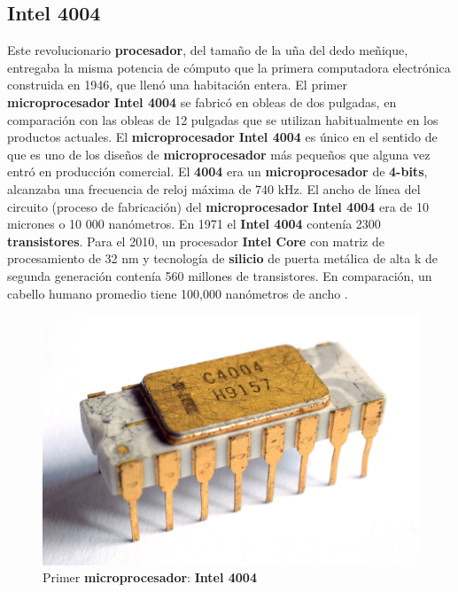 \subsection{\textbf{Intel 4004}}
Este revolucionario \textbf{procesador}, del tamaño de la uña del dedo meñique, entregaba la misma potencia de cómputo que la primera
computadora electrónica construida en 1946, que llenó una habitación entera. El primer \textbf{microprocesador} \textbf{Intel 4004} se
fabricó en obleas de dos pulgadas, en comparación con las obleas de 12 pulgadas que se utilizan habitualmente en los productos actuales.
El \textbf {microprocesador} \textbf{Intel 4004} es único en el sentido de que es uno de los diseños de \textbf{microprocesador} más
pequeños que alguna vez entró en producción comercial. El \textbf{4004}  era un \textbf{microprocesador} de \textbf{4-bits}, alcanzaba una 
frecuencia de reloj máxima de 740 kHz. El ancho de línea del circuito (proceso de fabricación) del \textbf{microprocesador} \textbf{Intel 4004} 
era de 10 micrones o 10 000 nanómetros. En 1971 el \textbf{Intel 4004} contenía 2300 \textbf{transistores}. Para el 2010, un procesador \textbf{Intel Core} con matriz de procesamiento
de 32 nm y tecnología de \textbf{silicio} de puerta metálica de alta k de segunda generación contenía  560 millones de transistores. En comparación,
un cabello humano promedio tiene 100,000 nanómetros de ancho .      

\begin{figure}[htb]
	\centering
	\includegraphics[scale = 0.15]{Graphics/Intel_C4004.jpg}
	\caption{Primer \textbf{microprocesador}: \textbf{Intel 4004}}
	\label{fig:12}
\end{figure}



